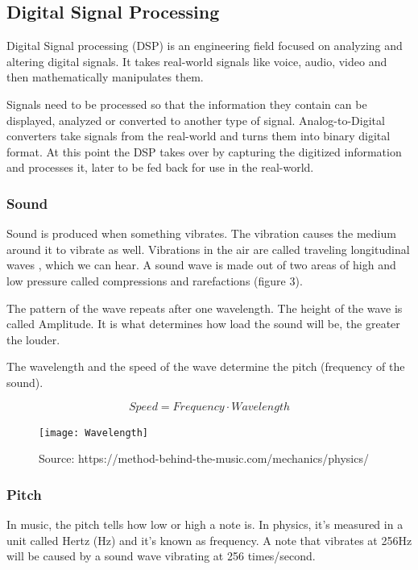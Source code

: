 \subsection{Digital Signal Processing}
Digital Signal processing (DSP) is an engineering field focused on analyzing and altering digital signals. It takes real-world signals like voice, audio, video and then mathematically manipulates them. \cite{dsp} \par

Signals need to be processed so that the information they contain can be displayed, analyzed or converted to another type of signal. Analog-to-Digital converters take signals from the real-world and turns them into binary digital format. At this point the DSP takes over by capturing the digitized information and processes it, later to be fed back for use in the real-world. \par

\subsubsection{Sound}
\par
Sound is produced when something vibrates. The vibration causes the medium around it to vibrate as well. Vibrations in the air are called traveling longitudinal waves \cite{physics_of_sound}, which we can hear.
A sound wave is made out of two areas of high and low pressure called compressions and rarefactions (figure 3). \par

The pattern of the wave repeats after one wavelength. The height of the wave is called Amplitude. It is what determines how load the sound will be, the greater the louder.

The wavelength and the speed of the wave determine the pitch (frequency of the sound). \par 


\begin{equation}
Speed = Frequency \cdot Wavelength
\end{equation}

\begin{figure}[h]
	\caption[Traveling Wave]{
		Source: https://method-behind-the-music.com/mechanics/physics/ }
	\centering
	\texttt{[image: Wavelength]}
\end{figure}

\subsubsection{Pitch}
In music, the pitch tells how low or high a note is. In physics, it's measured in a unit called Hertz (Hz) and it's known as frequency. A note that vibrates at 256Hz will be caused by a sound wave vibrating at 256 times/second. \par

